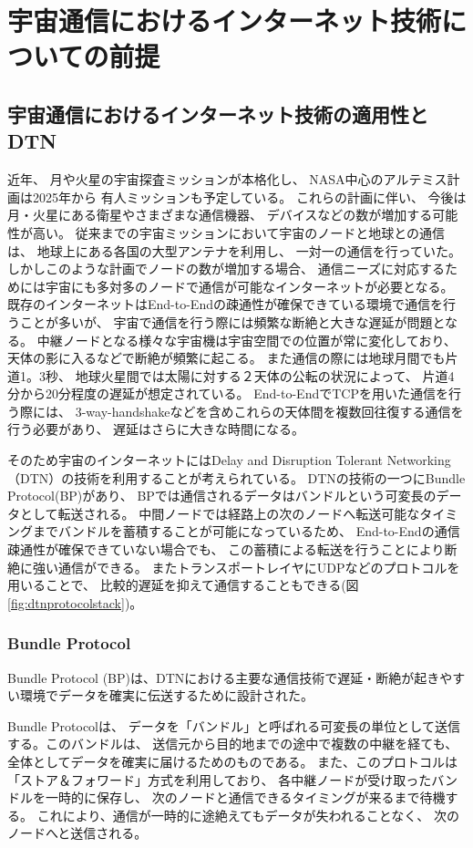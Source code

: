 \chapter{宇宙通信におけるインターネット技術についての前提}
\section{宇宙通信におけるインターネット技術の適用性とDTN}
近年、 月や火星の宇宙探査ミッションが本格化し、 NASA中心のアルテミス計画\cite{nasa2020}は2025年から
有人ミッションも予定している。 これらの計画に伴い、 今後は月・火星にある衛星やさまざまな通信機器、 
デバイスなどの数が増加する可能性が高い。 従来までの宇宙ミッションにおいて宇宙のノードと地球との通信は、 
地球上にある各国の大型アンテナを利用し、 一対一の通信を行っていた。 しかしこのような計画でノードの数が増加する場合、
通信ニーズに対応するためには宇宙にも多対多のノードで通信が可能なインターネットが必要となる。 
既存のインターネットはEnd-to-Endの疎通性が確保できている環境で通信を行うことが多いが、 
宇宙で通信を行う際には頻繁な断絶と大きな遅延が問題となる。 中継ノードとなる様々な宇宙機は宇宙空間での位置が常に変化しており、
 天体の影に入るなどで断絶が頻繁に起こる。 また通信の際には地球月間でも片道1。3秒、 
 地球火星間では太陽に対する２天体の公転の状況によって、 片道4分から20分程度の遅延が想定されている。 
 End-to-EndでTCPを用いた通信を行う際には、 3-way-handshakeなどを含めこれらの天体間を複数回往復する通信を行う必要があり、 
 遅延はさらに大きな時間になる。 

そのため宇宙のインターネットにはDelay and Disruption Tolerant Networking（DTN）の技術を利用することが考えられている。 
DTNの技術の一つにBundle Protocol(BP)があり、 BPでは通信されるデータはバンドルという可変長のデータとして転送される。 
中間ノードでは経路上の次のノードへ転送可能なタイミングまでバンドルを蓄積することが可能になっているため、 
End-to-Endの通信疎通性が確保できていない場合でも、 この蓄積による転送を行うことにより断絶に強い通信ができる。
 またトランスポートレイヤにUDPなどのプロトコルを用いることで、 
 比較的遅延を抑えて通信することもできる(図\ref{fig:dtnprotocolstack})。 

\subsection{Bundle Protocol}
Bundle Protocol (BP)は、DTNにおける主要な通信技術で遅延・断絶が起きやすい環境でデータを確実に伝送するために設計された。

Bundle Protocolは、 データを「バンドル」と呼ばれる可変長の単位として送信する。このバンドルは、 送信元から目的地までの途中で複数の中継を経ても、全体としてデータを確実に届けるためのものである。 また、このプロトコルは「ストア＆フォワード」方式を利用しており、 各中継ノードが受け取ったバンドルを一時的に保存し、 次のノードと通信できるタイミングが来るまで待機する。 これにより、通信が一時的に途絶えてもデータが失われることなく、 次のノードへと送信される。


